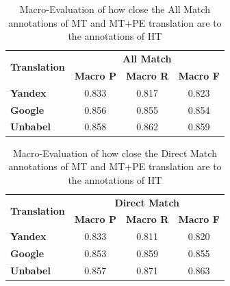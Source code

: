 \begin{table}[!htp]
\centering
\begin{tabular}{@{}lccc@{}}
\toprule
\multicolumn{1}{c}{\multirow{2}{*}{\textbf{Translation}}} & \multicolumn{3}{c}{\textbf{All Match}}                            \\ \cmidrule(l){2-4}
\multicolumn{1}{c}{}          & \textbf{Macro P}     & \textbf{Macro R}      & \textbf{Macro F}          \\ \midrule
\textbf{Yandex}   & 0.833                & 0.817                 & 0.823                   \\ 

\textbf{Google}   & 0.856                & 0.855                 & 0.854                   \\ 

\textbf{Unbabel}  & 0.858                & 0.862                 & 0.859         \\ \bottomrule 

\end{tabular}%
\caption{Macro-Evaluation of how close the All Match annotations of MT and MT+PE translation are to the annotations of HT}
\label{table: Results All Match Macro}
\end{table}


\begin{table}[!htp]
\centering
\begin{tabular}{@{}lccc@{}}
\toprule
\multicolumn{1}{c}{\multirow{2}{*}{\textbf{Translation}}} & \multicolumn{3}{c}{\textbf{Direct Match}}                            \\ \cmidrule(l){2-4}
\multicolumn{1}{c}{}          & \textbf{Macro P}     & \textbf{Macro R}      & \textbf{Macro F}          \\ \midrule
\textbf{Yandex}   & 0.833                & 0.811                 & 0.820                   \\ 

\textbf{Google}   & 0.853                & 0.859                 & 0.855                   \\ 

\textbf{Unbabel}  & 0.857                & 0.871                 & 0.863         \\ \bottomrule 

\end{tabular}%
\caption{Macro-Evaluation of how close the Direct Match annotations of MT and MT+PE translation are to the annotations of HT}
\label{table: Results Direct Match Macro}
\end{table}


